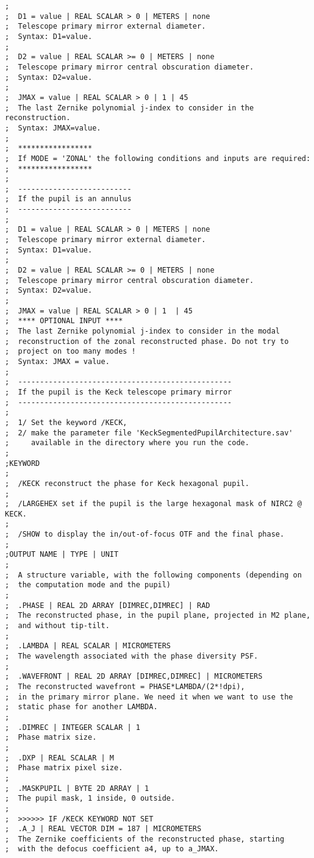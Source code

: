 \begin{lstlisting}
;
;  D1 = value | REAL SCALAR > 0 | METERS | none
;  Telescope primary mirror external diameter.
;  Syntax: D1=value.
;
;  D2 = value | REAL SCALAR >= 0 | METERS | none
;  Telescope primary mirror central obscuration diameter.
;  Syntax: D2=value.
;
;  JMAX = value | REAL SCALAR > 0 | 1 | 45
;  The last Zernike polynomial j-index to consider in the reconstruction.
;  Syntax: JMAX=value.
;
;  *****************
;  If MODE = 'ZONAL' the following conditions and inputs are required:
;  *****************
;
;  --------------------------
;  If the pupil is an annulus
;  --------------------------
;
;  D1 = value | REAL SCALAR > 0 | METERS | none
;  Telescope primary mirror external diameter.
;  Syntax: D1=value.
;
;  D2 = value | REAL SCALAR >= 0 | METERS | none
;  Telescope primary mirror central obscuration diameter.
;  Syntax: D2=value.
;
;  JMAX = value | REAL SCALAR > 0 | 1  | 45
;  **** OPTIONAL INPUT ****
;  The last Zernike polynomial j-index to consider in the modal
;  reconstruction of the zonal reconstructed phase. Do not try to
;  project on too many modes !
;  Syntax: JMAX = value.
;
;  -------------------------------------------------
;  If the pupil is the Keck telescope primary mirror
;  -------------------------------------------------
;
;  1/ Set the keyword /KECK,
;  2/ make the parameter file 'KeckSegmentedPupilArchitecture.sav'
;     available in the directory where you run the code.
;
;KEYWORD
;
;  /KECK reconstruct the phase for Keck hexagonal pupil.
;
;  /LARGEHEX set if the pupil is the large hexagonal mask of NIRC2 @ KECK.
;
;  /SHOW to display the in/out-of-focus OTF and the final phase.
;
;OUTPUT NAME | TYPE | UNIT
;
;  A structure variable, with the following components (depending on
;  the computation mode and the pupil)
;
;  .PHASE | REAL 2D ARRAY [DIMREC,DIMREC] | RAD
;  The reconstructed phase, in the pupil plane, projected in M2 plane,
;  and without tip-tilt.
;
;  .LAMBDA | REAL SCALAR | MICROMETERS
;  The wavelength associated with the phase diversity PSF.
;
;  .WAVEFRONT | REAL 2D ARRAY [DIMREC,DIMREC] | MICROMETERS
;  The reconstructed wavefront = PHASE*LAMBDA/(2*!dpi),
;  in the primary mirror plane. We need it when we want to use the
;  static phase for another LAMBDA.
;
;  .DIMREC | INTEGER SCALAR | 1
;  Phase matrix size.
;
;  .DXP | REAL SCALAR | M
;  Phase matrix pixel size.
;
;  .MASKPUPIL | BYTE 2D ARRAY | 1
;  The pupil mask, 1 inside, 0 outside.
;
;  >>>>>> IF /KECK KEYWORD NOT SET
;  .A_J | REAL VECTOR DIM = 187 | MICROMETERS
;  The Zernike coefficients of the reconstructed phase, starting
;  with the defocus coefficient a4, up to a_JMAX.

\end{lstlisting}
